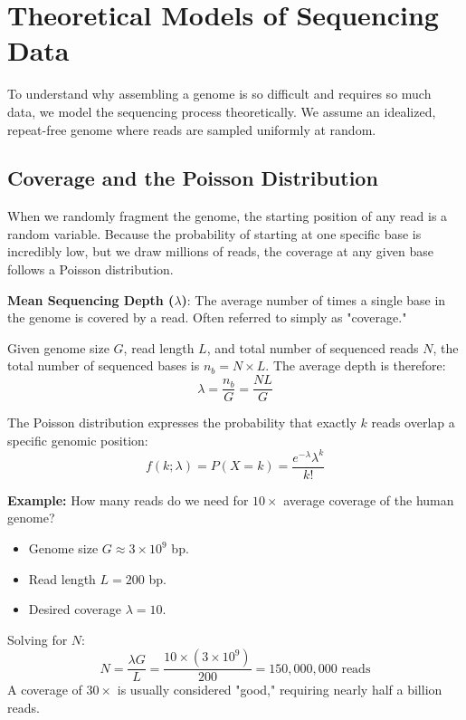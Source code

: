 \documentclass[11pt, a4paper]{article}
\begin{document}
\section{Theoretical Models of Sequencing Data}
To understand why assembling a genome is so difficult and requires so much data, we model the sequencing process theoretically. We assume an idealized, repeat-free genome where reads are sampled uniformly at random.

\subsection{Coverage and the Poisson Distribution}
When we randomly fragment the genome, the starting position of any read is a random variable. Because the probability of starting at one specific base is incredibly low, but we draw millions of reads, the coverage at any given base follows a Poisson distribution.

\begin{important}
    \textbf{Mean Sequencing Depth ($\lambda$)}: The average number of times a single base in the genome is covered by a read. Often referred to simply as "coverage."
\end{important}

Given genome size $G$, read length $L$, and total number of sequenced reads $N$, the total number of sequenced bases is $n_b = N \times L$. The average depth is therefore:
\[ \lambda = \frac{n_b}{G} = \frac{N L}{G} \]

The Poisson distribution expresses the probability that exactly $k$ reads overlap a specific genomic position:
\begin{equation} \label{eq:poisson}
    f(k; \lambda) = P(X = k) = \frac{e^{-\lambda} \lambda^k}{k!}
\end{equation}

\textbf{Example:} How many reads do we need for $10\times$ average coverage of the human genome?
\begin{itemize}
    \item Genome size $G \approx 3 \times 10^9$ bp.
    \item Read length $L = 200$ bp.
    \item Desired coverage $\lambda = 10$.
\end{itemize}
Solving for $N$:
\[ N = \frac{\lambda G}{L} = \frac{10 \times (3 \times 10^9)}{200} = 150,000,000 \text{ reads} \]
A coverage of $30\times$ is usually considered "good," requiring nearly half a billion reads.
\end{document}
